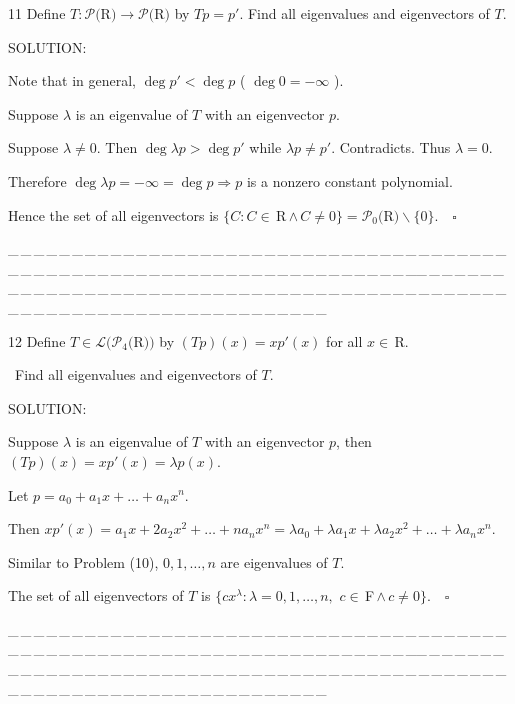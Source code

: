 \documentclass[a4paper, 11pt, UTF8]{article}
\def\Lm{\mathcal{L}}
\def\Po{\mathcal{P}}
\def\Fbf{$\,{\timesbf F}\,$}
\def\Rbf{$\,{\timesbf R}\,$}
\def\Rbfc{$\,{\timesbf R}$}
\begin{document}
\begin{large}
{\timesbf\Large 11} {\timessl\Large 
Define $T:\Po(${\timesbf R}$)\rightarrow\Po(${\timesbf R}$)$ by $Tp = p'$. Find all eigenvalues and eigenvectors of $T$.
}\par
{\timesbf S\footnotesize{OLUTION:}}\par\quad
Note that in general, $\deg p'<\deg p$ ( $\deg 0=-\infty$ ).\par\quad
Suppose $\lambda$ is an eigenvalue of $T$ with an eigenvector $p$.\par\quad
Suppose $\lambda\neq 0.$ Then $\deg\lambda p>\deg p'$ while $\lambda p\neq p'.$ Contradicts. Thus $\lambda=0.$\par\quad
Therefore $\deg \lambda p=-\infty=\deg p\Rightarrow p$ is a nonzero constant polynomial.\par\quad
Hence the set of all eigenvectors is $\{C:C\in\Rbf\wedge\,C\neq 0\}=\Po_0(${\timesbf R}$)\backslash\{0\}.\quad\square$\par
{\tiny \_\,\_\,\_\,\_\,\_\,\_\,\_\,\_\,\_\,\_\,\_\,\_\,\_\,\_\,\_\,\_\,\_\,\_\,\_\,\_\,\_\,\_\,\_\,\_\,\_\,\_\,\_\,\_\,\_\,\_\,\_\,\_\,\_\,\_\,\_\,\_\,\_\,\_\,\_\,\_\,\_\,\_\,\_\,\_\,\_\,\_\,\_\,\_\,\_\,\_\,\_\,\_\,\_\,\_\,\_\,\_\,\_\,\_\,\_\,\_\,\_\,\_\,\_\,\_\,\_\,\_\,\_\,\_\,\_\,\_\,\_\_\,\_\,\_\,\_\,\_\,\_\,\_\,\_\,\_\,\_\,\_\,\_\,\_\,\_\,\_\,\_\,\_\,\_\,\_\,\_\,\_\,\_\,\_\,\_\,\_\,\_\,\_\,\_\,\_\,\_\,\_\,\_\,\_\,\_\,\_\,\_\,\_\,\_\,\_\,\_\,\_\,\_\,\_\,\_\,\_\,\_\,\_\,\_\,\_\,\_\,\_\,\_\,\_\,\_\,\_\,\_\,\_\,\_\,\_\,\_\,\_\,\_\,\_\,\_\,\_\,\_\,\_\,\_\,\_\,\_\,\_}\par

{\timesbf\Large 12} {\timessl\Large 
Define $T\in\Lm(\Po_4(${\timesbf R}$))$ by $(Tp)(x) = xp'(x)$ for all $x\in\Rbfc.$}\par\quad\,
{\timessl\Large Find all eigenvalues and eigenvectors of $T$.}\par
{\timesbf S\footnotesize{OLUTION:}}\par\quad
Suppose $\lambda$ is an eigenvalue of $T$ with an eigenvector $p$, then $(Tp)(x)=xp'(x)=\lambda p(x).$\par\quad
Let $p=a_0+a_1 x+\dots+a_n x^n.$\par\quad
Then $xp'(x)=a_1 x+2a_2 x^2+\dots+n a_n x^n=\lambda a_0+\lambda a_1 x+\lambda a_2 x^2+\dots+\lambda a_n x^n.$\par\quad
Similar to Problem (10), $0,1,\dots,n$ are eigenvalues of $T.$\par\quad
The set of all eigenvectors of $T$ is $\{cx^\lambda:\lambda=0,1,\dots,n,\,\,c\in\Fbf\wedge\,c\neq 0\}.\quad\square$\par
{\tiny \_\,\_\,\_\,\_\,\_\,\_\,\_\,\_\,\_\,\_\,\_\,\_\,\_\,\_\,\_\,\_\,\_\,\_\,\_\,\_\,\_\,\_\,\_\,\_\,\_\,\_\,\_\,\_\,\_\,\_\,\_\,\_\,\_\,\_\,\_\,\_\,\_\,\_\,\_\,\_\,\_\,\_\,\_\,\_\,\_\,\_\,\_\,\_\,\_\,\_\,\_\,\_\,\_\,\_\,\_\,\_\,\_\,\_\,\_\,\_\,\_\,\_\,\_\,\_\,\_\,\_\,\_\,\_\,\_\,\_\,\_\_\,\_\,\_\,\_\,\_\,\_\,\_\,\_\,\_\,\_\,\_\,\_\,\_\,\_\,\_\,\_\,\_\,\_\,\_\,\_\,\_\,\_\,\_\,\_\,\_\,\_\,\_\,\_\,\_\,\_\,\_\,\_\,\_\,\_\,\_\,\_\,\_\,\_\,\_\,\_\,\_\,\_\,\_\,\_\,\_\,\_\,\_\,\_\,\_\,\_\,\_\,\_\,\_\,\_\,\_\,\_\,\_\,\_\,\_\,\_\,\_\,\_\,\_\,\_\,\_\,\_\,\_\,\_\,\_\,\_\,\_}\par


\end{large}
\end{document}
